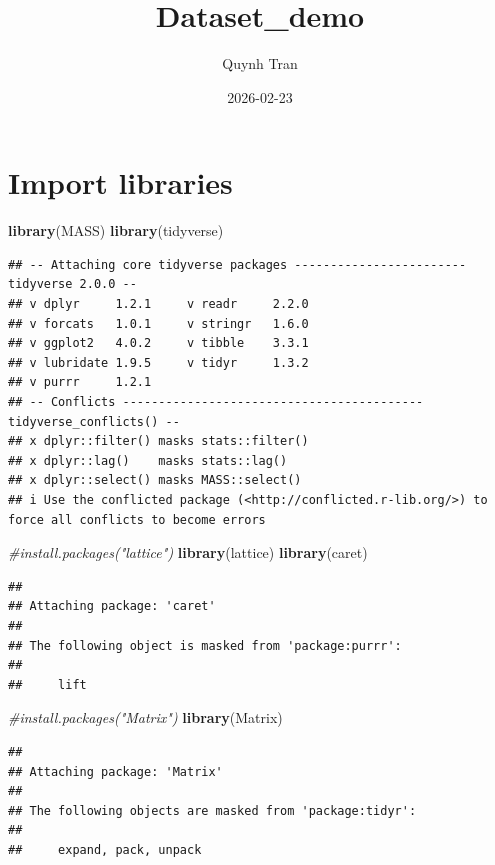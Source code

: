\documentclass[
]{article}
\title{Dataset\_demo}
\author{Quynh Tran}
\date{2026-02-23}
\newenvironment{Shaded}{\begin{snugshade}}{\end{snugshade}}
\newcommand{\CommentTok}[1]{\textcolor[rgb]{0.56,0.35,0.01}{\textit{#1}}}
\newcommand{\FunctionTok}[1]{\textcolor[rgb]{0.13,0.29,0.53}{\textbf{#1}}}
\newcommand{\NormalTok}[1]{#1}
\begin{document}
\maketitle

\section{Import libraries}\label{import-libraries}

\begin{Shaded}
\begin{Highlighting}[]
\FunctionTok{library}\NormalTok{(MASS)}
\FunctionTok{library}\NormalTok{(tidyverse)}
\end{Highlighting}
\end{Shaded}

\begin{verbatim}
## -- Attaching core tidyverse packages ------------------------ tidyverse 2.0.0 --
## v dplyr     1.2.1     v readr     2.2.0
## v forcats   1.0.1     v stringr   1.6.0
## v ggplot2   4.0.2     v tibble    3.3.1
## v lubridate 1.9.5     v tidyr     1.3.2
## v purrr     1.2.1     
## -- Conflicts ------------------------------------------ tidyverse_conflicts() --
## x dplyr::filter() masks stats::filter()
## x dplyr::lag()    masks stats::lag()
## x dplyr::select() masks MASS::select()
## i Use the conflicted package (<http://conflicted.r-lib.org/>) to force all conflicts to become errors
\end{verbatim}

\begin{Shaded}
\begin{Highlighting}[]
\CommentTok{\#install.packages("lattice")}
\FunctionTok{library}\NormalTok{(lattice)}
\FunctionTok{library}\NormalTok{(caret)}
\end{Highlighting}
\end{Shaded}

\begin{verbatim}
## 
## Attaching package: 'caret'
## 
## The following object is masked from 'package:purrr':
## 
##     lift
\end{verbatim}

\begin{Shaded}
\begin{Highlighting}[]
\CommentTok{\#install.packages("Matrix")}
\FunctionTok{library}\NormalTok{(Matrix)}
\end{Highlighting}
\end{Shaded}

\begin{verbatim}
## 
## Attaching package: 'Matrix'
## 
## The following objects are masked from 'package:tidyr':
## 
##     expand, pack, unpack
\end{verbatim}
\end{document}
